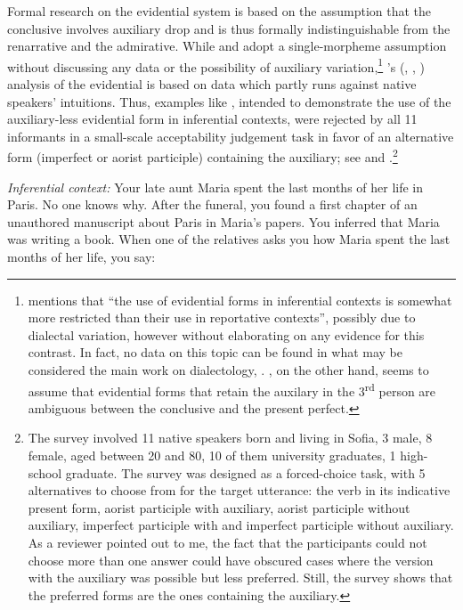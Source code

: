 \documentclass[output=paper]{langscibook}
\begin{document}
Formal research on the  evidential system is based on the assumption that the conclusive involves auxiliary drop and is thus formally indistinguishable from the renarrative and the admirative. While \citet{Izvorski1997} and \citet{Koev2017} adopt a single-morpheme assumption without discussing any data or the possibility of auxiliary variation,\footnote{\citet[3, fn. 2]{Koev2017} mentions that ``the use of evidential forms in inferential contexts is somewhat more restricted than their use in reportative contexts'', possibly due to dialectal variation, however without elaborating on any evidence for this contrast. In fact, no data on this topic can be found in what may be considered the main work on  dialectology, \citet{Stoykov2002}. \citet{Izvorski1997}, on the other hand, seems to assume that evidential forms that retain the auxilary in the 3\textsuperscript{rd} person are ambiguous between the conclusive and the present perfect.}
\citeauthor{Smirnova2013}'s (\citeyear{Smirnova2011a}, \citeyear{Smirnova2011b}, \citeyear{Smirnova2013}) analysis of the evidential is based on data which partly runs against native speakers' intuitions. Thus, examples like , intended to demonstrate the use of the auxiliary-less evidential form in inferential contexts, were rejected by all 11 informants in a small-scale acceptability judgement task in favor of an alternative form (imperfect or aorist participle) containing the auxiliary; see  and .\footnote{The survey involved 11 native speakers born and living in Sofia, 3 male, 8 female, aged between 20 and 80, 10 of them university graduates, 1 high-school graduate. The survey was designed as a forced-choice task, with 5 alternatives to choose from for the target utterance: the verb in its indicative present form, aorist participle with auxiliary, aorist participle without auxiliary, imperfect participle with and imperfect participle without auxiliary. As a reviewer pointed out to me, the fact that the participants could not choose more than one answer could have obscured cases where the version with the auxiliary was possible but less preferred. Still, the survey shows that the preferred forms are the ones containing the auxiliary.}

\eanoraggedright \textit{Inferential context:} Your late aunt Maria spent the
last months of her life in Paris. No one knows why. After the
funeral, you found a first chapter of an unauthored manuscript about Paris in Maria’s papers. You inferred that Maria was writing a book. When one of the relatives asks you how Maria spent the last months of her life, you say:\label{smirnova:infer-acceptability}
\end{document}
